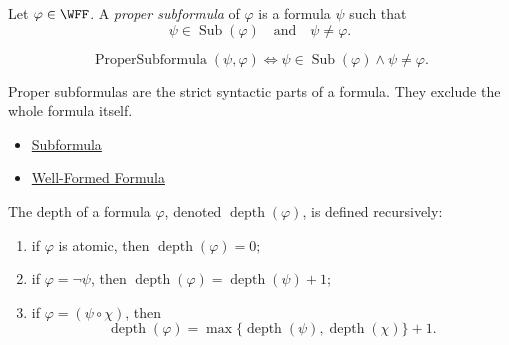 \begin{tcolorbox}[colback=propbox, colframe=propborder, arc=2pt,
  left=6pt, right=6pt, top=4pt, bottom=4pt,
  title={\small\textbf{Definition (Proper Subformula)}},
  fonttitle=\small\bfseries]
\begin{definition}
\label{def:proper-subformula}
Let \(\varphi\in\WFF\). A \emph{proper subformula} of \(\varphi\) is a
formula \(\psi\) such that
\[
\psi\in\operatorname{Sub}(\varphi)
\quad\text{and}\quad
\psi\neq\varphi.
\]
\end{definition}
\end{tcolorbox}

\begin{remark*}
\[
\operatorname{ProperSubformula}(\psi,\varphi)
\Longleftrightarrow
\psi\in\operatorname{Sub}(\varphi)\land\psi\neq\varphi.
\]
\end{remark*}

\begin{remark*}[Interpretation]
Proper subformulas are the strict syntactic parts of a formula. They exclude the
whole formula itself.
\end{remark*}

\begin{dependencies}
\begin{itemize}
  \item \hyperref[def:subformula-propositional-logic]{Subformula}
  \item \hyperref[def:well-formed-formula]{Well-Formed Formula}
\end{itemize}
\end{dependencies}

\begin{tcolorbox}[colback=propbox, colframe=propborder, arc=2pt,
  left=6pt, right=6pt, top=4pt, bottom=4pt,
  title={\small\textbf{Definition (Formula Depth)}},
  fonttitle=\small\bfseries]
\begin{definition}
\label{def:formula-depth-propositional-logic}
The depth of a formula \(\varphi\), denoted \(\operatorname{depth}(\varphi)\), is defined recursively:
\begin{enumerate}
\item if \(\varphi\) is atomic, then \(\operatorname{depth}(\varphi)=0\);
\item if \(\varphi=\neg\psi\), then \(\operatorname{depth}(\varphi)=\operatorname{depth}(\psi)+1\);
\item if \(\varphi=(\psi\circ\chi)\), then
\[
\operatorname{depth}(\varphi)=\max\{\operatorname{depth}(\psi),\operatorname{depth}(\chi)\}+1.
\]
\end{enumerate}
\end{definition}
\end{tcolorbox}

